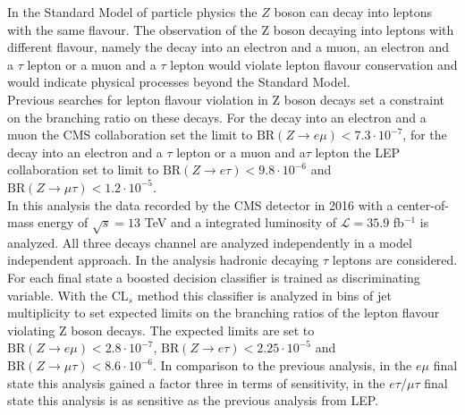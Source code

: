 \thispagestyle{empty}

In the Standard Model of particle physics the $Z$ boson can decay into  leptons with the same flavour. The observation of the Z boson decaying into leptons with different flavour, namely the decay into an electron and a muon, an electron and a $\tau$ lepton or a muon and a $\tau$ lepton would violate lepton flavour conservation and would indicate physical processes beyond the Standard Model. \\

Previous searches for lepton flavour violation in Z boson decays set a constraint on the branching ratio on these decays. For the decay into an electron and a muon the CMS collaboration set the limit to $\text{BR}(Z\to e\mu) < 7.3\cdot 10^{-7}$, for the decay into an electron and a $\tau$ lepton or a muon and a$\tau$ lepton the LEP collaboration set to limit to $\text{BR}(Z\to e\tau) < 9.8\cdot 10^{-6}$ and $\text{BR}(Z\to \mu\tau) < 1.2\cdot 10^{-5}$. \\

In this analysis the data recorded by the CMS detector in 2016 with a center-of-mass energy of $\sqrt{s} = 13$ TeV and a integrated luminosity of $\mathcal{L} = 35.9$ fb$^{-1}$ is analyzed. All three decays channel are analyzed independently in a model independent approach. In the analysis hadronic decaying $\tau$ leptons are considered. For each final state a boosted decision classifier is trained as discriminating variable. With the CL$_s$ method this classifier is analyzed in bins of jet multiplicity to set expected limits on the branching ratios of the lepton flavour violating Z boson decays. The expected limits are set to $\text{BR}(Z\to e\mu) < 2.8\cdot 10^{-7}$,  $\text{BR}(Z\to e\tau) < 2.25\cdot 10^{-5}$ and  $\text{BR}(Z\to \mu\tau) < 8.6\cdot 10^{-6}$. In comparison to the previous analysis, in the $e\mu$ final state this analysis gained a factor three in terms of sensitivity, in the $e\tau$/$\mu\tau$ final state this analysis is as sensitive as the previous analysis from LEP.
